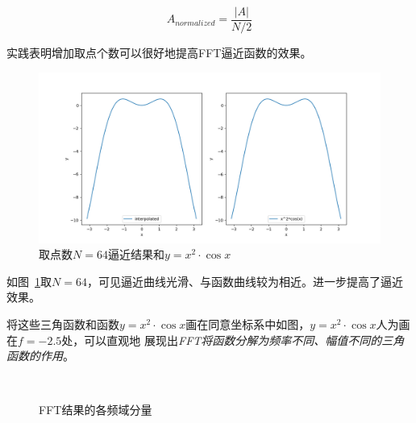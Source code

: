 \documentclass[a4paper,twoside]{article}
\begin{document}
\begin{spacing}{1.2}
\begin{equation}
	\label{eqn:normalize_amp}
	A_{normalized}=\frac{|A|}{N/2}
\end{equation}

实践表明增加取点个数可以很好地提高FFT逼近函数的效果。

\begin{figure}[H]
	\centering
	\label{fig:result2}
	\includegraphics[width=0.8\linewidth]{result_morepoints.png}
	\caption{取点数$N=64$逼近结果和$y=x^2\cdot\cos x$}
\end{figure}

如图~\ref{fig:result2}取$N=64$，可见逼近曲线光滑、与函数曲线较为相近。进一步提高了逼近效果。

将这些三角函数和函数$y=x^2\cdot \cos x$画在同意坐标系中如图，$y=x^2\cdot \cos x$人为画在$f=-2.5$处，可以直观地
展现出\emph{FFT将函数分解为频率不同、幅值不同的三角函数的作用}。

\begin{figure}[H]
	\centering 
	~
	\caption{FFT结果的各频域分量} 
	\label{fig:freq3d}
\end{figure}


\end{spacing}
\end{document}
